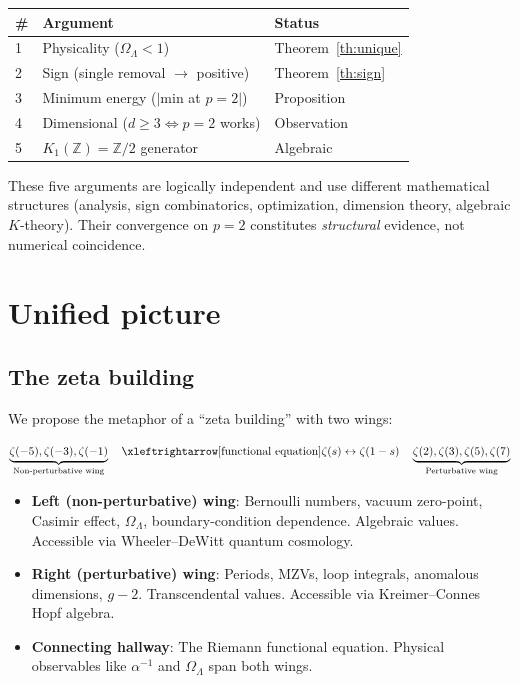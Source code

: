 \documentclass[11pt,a4paper]{article}
\begin{document}
\begin{center}
\begin{tabular}{lll}
\toprule
\# & Argument & Status \\
\midrule
1 & Physicality ($\Omega_\Lambda < 1$) & Theorem~\ref{th:unique} \\
2 & Sign (single removal $\to$ positive) & Theorem~\ref{th:sign} \\
3 & Minimum energy ($|$min at $p{=}2|$) & Proposition \\
4 & Dimensional ($d \geq 3 \Leftrightarrow p{=}2$ works) & Observation \\
5 & $K_1(\mathbb{Z}) = \mathbb{Z}/2$ generator & Algebraic \\
\bottomrule
\end{tabular}
\end{center}

These five arguments are logically independent and use different
mathematical structures (analysis, sign combinatorics, optimization,
dimension theory, algebraic $K$-theory). Their convergence on
$p = 2$ constitutes \emph{structural} evidence, not numerical
coincidence.

\section{Unified picture}

\subsection{The zeta building}

We propose the metaphor of a ``zeta building'' with two wings:

\begin{equation}
\underbrace{\zeta(-5), \zeta(-3), \zeta(-1)}_{\text{Non-perturbative wing}}
\quad \xleftrightarrow[\text{functional equation}]{\zeta(s) \leftrightarrow \zeta(1-s)} \quad
\underbrace{\zeta(2), \zeta(3), \zeta(5), \zeta(7)}_{\text{Perturbative wing}}
\end{equation}

\begin{itemize}
\item \textbf{Left (non-perturbative) wing}: Bernoulli numbers,
vacuum zero-point, Casimir effect, $\Omega_\Lambda$,
boundary-condition dependence. Algebraic values. Accessible
via Wheeler--DeWitt quantum cosmology.

\item \textbf{Right (perturbative) wing}: Periods, MZVs, loop
integrals, anomalous dimensions, $g-2$. Transcendental values.
Accessible via Kreimer--Connes Hopf algebra.

\item \textbf{Connecting hallway}: The Riemann functional equation.
Physical observables like $\alpha^{-1}$ and $\Omega_\Lambda$ span
both wings.
\end{itemize}
\end{document}

